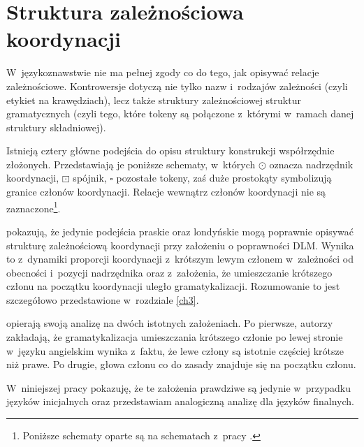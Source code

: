 \section{Struktura zależnościowa koordynacji}

W~językoznawstwie nie ma pełnej zgody co do tego, jak opisywać relacje zależnościowe. Kontrowersje dotyczą nie tylko nazw i~rodzajów zależności (czyli etykiet na krawędziach), lecz także struktury zależnościowej struktur gramatycznych (czyli tego, które tokeny są połączone z~którymi w~ramach danej struktury składniowej).

Istnieją cztery główne podejścia do opisu struktury konstrukcji współrzędnie złożonych. Przedstawiają je poniższe schematy, w~których $\odot$ oznacza nadrzędnik koordynacji, $\boxdot$ spójnik, $\square$ pozostałe tokeny, zaś duże prostokąty symbolizują granice członów koordynacji. Relacje wewnątrz członów koordynacji nie są zaznaczone\footnote{
Poniższe schematy oparte są na schematach  z~pracy \cite{przepiorkowski2023conjunct}.}.



\cite{przepiorkowski2023conjunct} pokazują, że jedynie podejścia praskie oraz londyńskie mogą poprawnie opisywać strukturę zależnościową koordynacji przy założeniu o poprawności DLM. Wynika to z~dynamiki proporcji koordynacji z~krótszym lewym członem w~zależności od obecności i~pozycji nadrzędnika oraz z~założenia, że umieszczanie krótszego członu na początku koordynacji uległo gramatykalizacji. Rozumowanie to jest szczegółowo przedstawione w~rozdziale \ref{ch3}.

\cite{przepiorkowski2023conjunct} opierają swoją analizę na dwóch istotnych założeniach. Po pierwsze, autorzy zakładają, że gramatykalizacja umieszczania krótszego członie po lewej stronie w~języku angielskim wynika z~faktu, że lewe człony są istotnie częściej krótsze niż prawe. Po drugie, głowa członu co do zasady znajduje się na początku członu. 

W~niniejszej pracy pokazuję, że te założenia prawdziwe są jedynie w~przypadku języków inicjalnych oraz przedstawiam analogiczną analizę dla języków finalnych.


